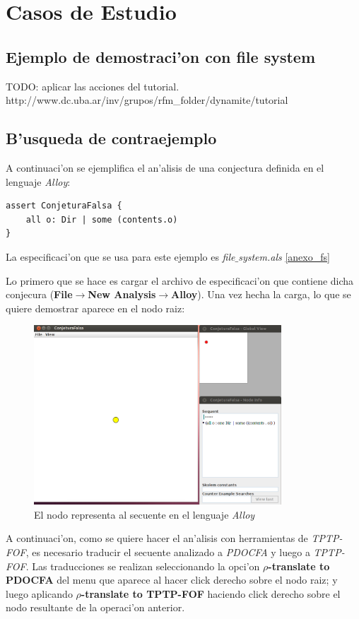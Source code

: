\chapter{Casos de Estudio}

\section{Ejemplo de demostraci'on con file system}

TODO: aplicar las acciones del tutorial.
http://www.dc.uba.ar/inv/grupos/rfm_folder/dynamite/tutorial


\section{B'usqueda de contraejemplo}

A continuaci'on se ejemplifica el an'alisis de una conjectura definida en el lenguaje \textit{Alloy}:

\begin{verbatim}
assert ConjeturaFalsa {
    all o: Dir | some (contents.o)
}
\end{verbatim}

La especificaci'on que se usa para este ejemplo es \textit{file$\_$system.als} \ref{anexo_fs}

Lo primero que se hace es cargar el archivo de especificaci'on que contiene dicha conjecura (\textbf{File$\rightarrow$New Analysis$\rightarrow$Alloy}). Una vez hecha la carga, lo que se quiere demostrar aparece en el nodo raiz:

\begin{figure}[H]
	\includegraphics[width=350px]{img/conjetura_falsa_1.png}
	\centering
	\caption{El nodo representa al secuente en el lenguaje \textit{Alloy}}
\end{figure}

A continuaci'on, como se quiere hacer el an'alisis con herramientas de \textit{TPTP-FOF}, es necesario traducir el secuente analizado a \textit{PDOCFA} y luego a \textit{TPTP-FOF}. Las traducciones se realizan seleccionando la opci'on \textbf{$\rho$-translate to PDOCFA} del menu que aparece al hacer click derecho sobre el nodo raiz; y luego aplicando \textbf{$\rho$-translate to TPTP-FOF} haciendo click derecho sobre el nodo resultante de la operaci'on anterior. 

